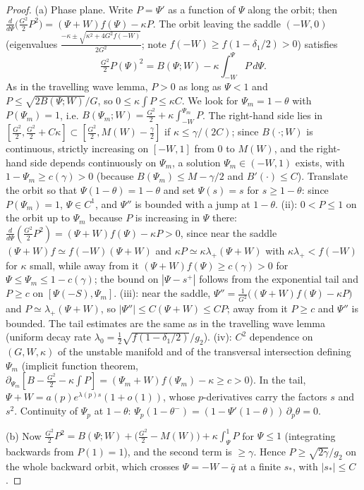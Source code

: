 \documentclass[11pt]{amsart}
\theoremstyle{definition}
\theoremstyle{remark}
\begin{document}
\begin{proof}
(a) Phase plane. Write $P=\Psi'$ as a function of $\Psi$ along the orbit; then
$\frac{d}{d\Psi}\big(\tfrac{G^2}{2}P^2\big)=(\Psi+W)f(\Psi)-\kappa P$. The orbit leaving
the saddle $(-W,0)$ (eigenvalues $\frac{-\kappa\pm\sqrt{\kappa^2+4G^2f(-W)}}{2G^2}$; note
$f(-W)\ge f(1-\delta_1/2)>0$) satisfies
\begin{equation}\label{eq:en}
\tfrac{G^2}{2}P(\Psi)^2=B(\Psi;W)-\kappa\int_{-W}^{\Psi}P\,d\Psi .
\end{equation}
As in the travelling wave lemma, $P>0$ as long as $\Psi<1$ and
$P\le\sqrt{2B(\Psi;W)}/G$, so $0\le\kappa\int P\le\kappa C$. We look for
$\Psi_m=1-\theta$ with $P(\Psi_m)=1$, i.e.
$B(\Psi_m;W)=\frac{G^2}2+\kappa\int_{-W}^{\Psi_m}P$. The right-hand side lies in
$[\frac{G^2}2,\frac{G^2}2+C\kappa]\subset[\frac{G^2}{2},M(W)-\frac\gamma2]$ if $\kappa\le\gamma/(2C)$;
since $B(\cdot;W)$ is continuous, strictly increasing on $[-W,1]$ from $0$ to
$M(W)$, and the right-hand side depends continuously on $\Psi_m$, a solution
$\Psi_m\in(-W,1)$ exists, with $1-\Psi_m\ge c(\gamma)>0$ (because
$B(\Psi_m)\le M-\gamma/2$ and $B'(\cdot)\le C$). Translate the orbit so that
$\Psi(1-\theta)=1-\theta$ and set $\Psi(s)=s$ for $s\ge1-\theta$: since
$P(\Psi_m)=1$, $\Psi\in C^1$, and $\Psi''$ is bounded with a jump at $1-\theta$.
(ii): $0<P\le1$ on the orbit up to $\Psi_m$ because $P$ is increasing in
$\Psi$ there: $\frac{d}{d\Psi}(\frac{G^2}2P^2)=(\Psi+W)f(\Psi)-\kappa P>0$, since near the
saddle $(\Psi+W)f\simeq f(-W)(\Psi+W)$ and $\kappa P\simeq\kappa\lambda_+(\Psi+W)$ with
$\kappa\lambda_+<f(-W)$ for $\kappa$ small, while away from it
$(\Psi+W)f(\Psi)\ge c(\gamma)>0$ for $\Psi\le\Psi_m\le1-c(\gamma)$; the bound on $|\Psi-s^+|$
follows from the exponential tail and $P\ge c$ on $[\Psi(-S),\Psi_m]$.
(iii): near the saddle, $\Psi''=\frac1{G^2}\big((\Psi+W)f(\Psi)-\kappa P\big)$ and
$P\simeq\lambda_+(\Psi+W)$, so $|\Psi''|\le C(\Psi+W)\le CP$; away from it $P\ge c$
and $\Psi''$ is bounded. The tail estimates are the same as in the travelling
wave lemma (uniform decay rate $\lambda_0=\frac12\sqrt{f(1-\delta_1/2)}/g_2$).
(iv): $C^2$ dependence on $(G,W,\kappa)$ of the unstable manifold and of the
transversal intersection defining $\Psi_m$ (implicit function theorem,
$\partial_{\Psi_m}[B-\frac{G^2}{2}-\kappa\int P]=(\Psi_m+W)f(\Psi_m)-\kappa\ge c>0$).
In the tail, $\Psi+W=a(p)e^{\lambda(p)s}(1+o(1))$, whose $p$-derivatives carry
the factors $s$ and $s^2$. Continuity of $\Psi_p$ at $1-\theta$:
$\Psi_p(1-\theta^-)=(1-\Psi'(1-\theta))\,\partial_p\theta=0$.

(b) Now $\frac{G^2}{2}P^2=B(\Psi;W)+\big(\frac{G^2}2-M(W)\big)+\kappa\int_\Psi^1P$ for
$\Psi\le1$ (integrating backwards from $P(1)=1$), and the second term is
$\ge\gamma$. Hence $P\ge\sqrt{2\gamma}/g_2$ on the whole backward orbit, which
crosses $\Psi=-W-\bar q$ at a finite $s_*$, with $|s_*|\le C$.
\end{proof}
\end{document}
